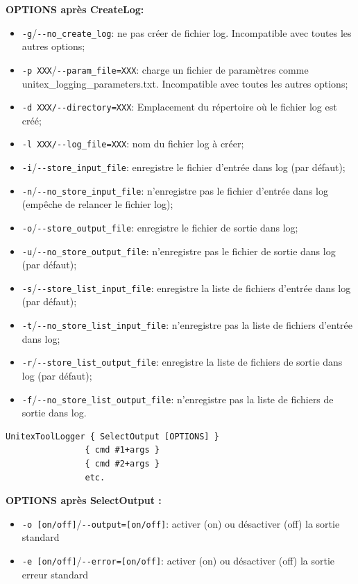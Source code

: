 \bigskip
\noindent \textbf{OPTIONS après CreateLog:}
\begin{itemize}
\item \verb+-g+/\verb+--no_create_log+: ne pas créer de fichier log. Incompatible avec toutes les autres options;

\item \verb+-p XXX+/\verb+--param_file=XXX+: charge un fichier de paramètres comme unitex\_logging\_parameters.txt. Incompatible avec toutes les autres options;

\item \verb+-d XXX/--directory=XXX+: Emplacement du répertoire où le fichier log est créé;
\item \verb+-l XXX/--log_file=XXX+: nom du fichier log à créer;
\item \verb+-i+/\verb+--store_input_file+: enregistre le fichier d'entrée dans log (par défaut);
\item \verb+-n+/\verb+--no_store_input_file+: n'enregistre pas le fichier d'entrée dans log (empêche de relancer le fichier log);
\item \verb+-o+/\verb+--store_output_file+: enregistre le fichier de sortie dans log;
\item \verb+-u+/\verb+--no_store_output_file+: n'enregistre pas le fichier de sortie dans log (par défaut);
\item \verb+-s+/\verb+--store_list_input_file+: enregistre la liste de fichiers d'entrée dans log (par défaut);
\item \verb+-t+/\verb+--no_store_list_input_file+:  n'enregistre pas la liste de fichiers d'entrée dans log;
\item \verb+-r+/\verb+--store_list_output_file+: enregistre la liste de fichiers de sortie dans log (par défaut);
\item \verb+-f+/\verb+--no_store_list_output_file+: n'enregistre pas la liste de fichiers de sortie dans log.
\end{itemize}

 
\bigskip
\begin{verbatim}
UnitexToolLogger { SelectOutput [OPTIONS] } 
                { cmd #1+args } 
                { cmd #2+args }
                etc.
\end{verbatim}

\bigskip
\noindent \textbf{OPTIONS après SelectOutput :}
\begin{itemize}
\item \verb+-o [on/off]+/\verb+--output=[on/off]+: activer (on) ou désactiver (off) la sortie standard
\item \verb+-e [on/off]+/\verb+--error=[on/off]+: activer (on) ou désactiver (off) la sortie erreur standard
\end{itemize} 

